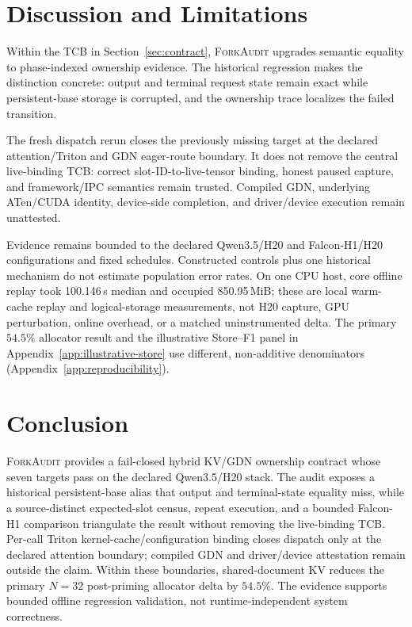 \documentclass{article}
\newcommand{\method}{\textsc{ForkAudit}}
\begin{document}
\section{Discussion and Limitations}
\label{sec:limitations}

Within the TCB in Section~\ref{sec:contract}, \method{} upgrades semantic
equality to phase-indexed ownership evidence.  The historical regression makes
the distinction concrete: output and terminal request state remain exact while
persistent-base storage is corrupted, and the ownership trace localizes the
failed transition.

The fresh dispatch rerun closes the previously missing target at the declared
attention/Triton and GDN eager-route boundary.  It does not remove the central
live-binding TCB: correct slot-ID-to-live-tensor binding, honest paused capture,
and framework/IPC semantics remain trusted.  Compiled GDN, underlying
ATen/CUDA identity, device-side completion, and driver/device execution remain
unattested.

Evidence remains bounded to the declared Qwen3.5/H20 and Falcon-H1/H20
configurations and fixed schedules.  Constructed controls plus one historical
mechanism do not estimate population error rates.  On one CPU host, core
offline replay took 100.146\,s median and occupied 850.95\,MiB; these are local
warm-cache replay and logical-storage measurements, not H20 capture, GPU
perturbation, online overhead, or a matched uninstrumented delta.  The primary
$54.5\%$ allocator result and the illustrative Store--F1 panel in
Appendix~\ref{app:illustrative-store} use different, non-additive denominators
(Appendix~\ref{app:reproducibility}).

\FloatBarrier

\section{Conclusion}

\method{} provides a fail-closed hybrid KV/GDN ownership contract whose seven
targets pass on the declared Qwen3.5/H20 stack.  The audit exposes a historical
persistent-base alias that output and terminal-state equality miss, while a
source-distinct expected-slot census, repeat execution, and a bounded Falcon-H1
comparison triangulate the result without removing the live-binding TCB.
Per-call Triton kernel-cache/configuration binding closes dispatch only at the
declared attention boundary; compiled GDN and driver/device attestation remain
outside the claim.  Within these boundaries, shared-document KV reduces the
primary $N=32$ post-priming allocator delta by $54.5\%$.  The evidence supports
bounded offline regression validation, not runtime-independent system
correctness.
\end{document}
